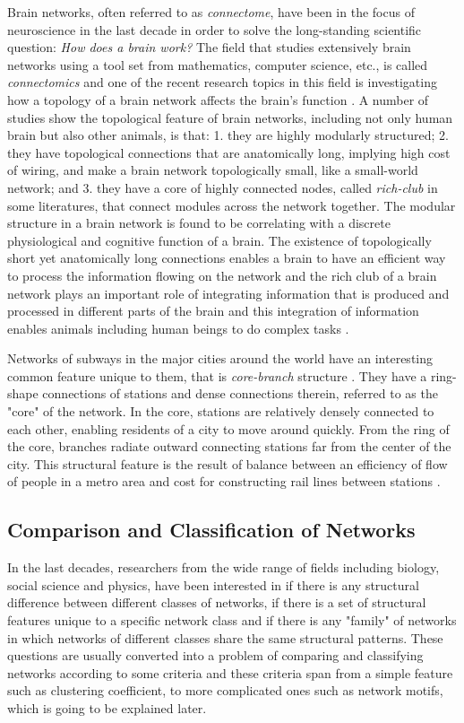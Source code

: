 \documentclass{article}
\begin{document}
Brain networks, often referred to as \textit{connectome}, have been in the focus of neuroscience in the last decade in order to solve the long-standing scientific question: \textit{How does a brain work?}  The field that studies extensively brain networks using a tool set from mathematics, computer science, etc., is called \textit{connectomics} and one of the recent research topics in this field is investigating how a topology of a brain network affects the brain's function \cite{ComparativeConnectome}. A number of studies show the topological feature of brain networks, including not only human brain but also other animals, is that: 1. they are highly modularly structured; 2. they have topological connections that are anatomically long, implying high cost of wiring, and make a brain network topologically small, like a small-world network; and 3. they have a core of highly connected nodes, called \textit{rich-club} in some literatures, that connect modules across the network together. The modular structure in a brain network is found to be correlating with a discrete physiological and cognitive function of a brain. The existence of topologically short yet anatomically long connections enables a brain to have an efficient way to process the information flowing on the network and the rich club of a brain network plays an important role of integrating information that is produced and processed in different parts of the brain and this integration of information enables animals including human beings to do complex tasks \cite{BrainEconomy}.

Networks of subways in the major cities around the world have an interesting common feature unique to them, that is \textit{core-branch} structure \cite{Train}. They have a ring-shape connections of stations and dense connections therein, referred to as the "core" of the network. In the core, stations are relatively densely connected to each other, enabling residents of a city to move around quickly. From the ring of the core, branches radiate outward connecting stations far from the center of the city. This structural feature is the result of balance between an efficiency of flow of people in a metro area and cost for constructing rail lines between stations \cite{SpatioalNetwork1,SpatioalNetwork2}. 


	
	\subsection{Comparison and Classification of Networks}
	 In the last decades, researchers from the wide range of fields including biology, social science and physics, have been interested in if there is any structural difference between different classes of networks, if there is a set of structural features unique to a specific network class and if there is any "family" of networks in which networks of different classes share the same structural patterns. These questions are usually converted into a problem of comparing and classifying networks according to some criteria and these criteria span from a simple feature such as clustering coefficient, to more complicated ones such as network motifs, which is going to be explained later.
	
\end{document}
